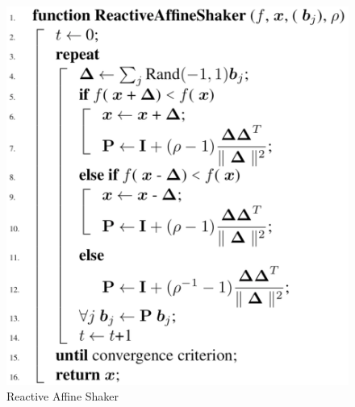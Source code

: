 \documentclass[11pt]{article}
\begin{document}
\begin{figure}[H]
\includegraphics[scale=0.25]{ras}
\caption{Reactive Affine Shaker}
\centering
\label{fig:ras}
\end{figure}
\end{document}
